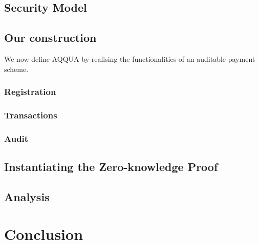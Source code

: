\documentclass[a4paper, thm-restate]{book}
\begin{document}
        \section{Security Model}\label{sec:model}
        
        
        

        \section{Our construction}\label{sec:scheme}
        We now define AQQUA by realising the functionalities of an auditable payment scheme.

        
        \subsection{Registration}
            
            
            
        \subsection{Transactions}  
            
            
            
            
            
        \subsection{Audit}
            
            
        
        \section{Instantiating the Zero-knowledge Proof}
        
        \section{Analysis}
            


    \chapter{Conclusion}
    

    \printbibliography
\end{document}
